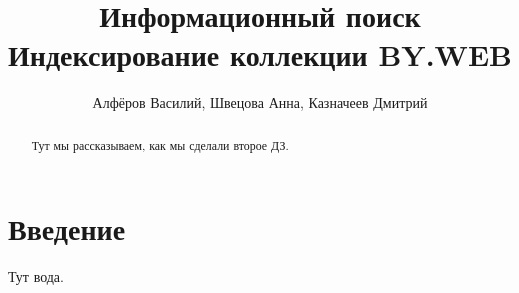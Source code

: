 \documentclass[twocolumn]{article}
\title{Информационный поиск\\ Индексирование коллекции BY.WEB}
\author{Алфёров Василий, Швецова Анна, Казначеев Дмитрий}
\begin{document}
\maketitle

\begin{abstract}
    Тут мы рассказываем, как мы сделали второе ДЗ.
\end{abstract}

\section{Введение}

Тут вода.






\end{document}
